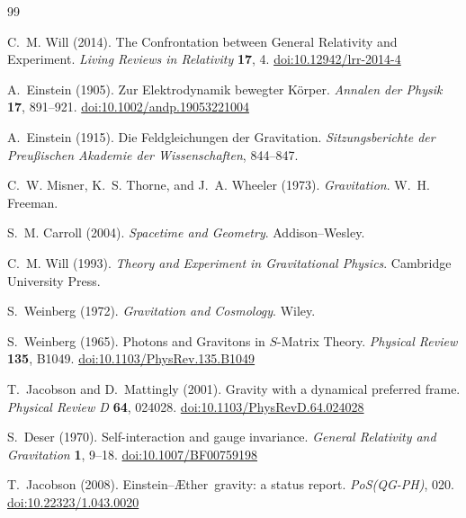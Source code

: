 \documentclass[12pt,a4paper]{article}
\providecommand{\doi}[1]{\href{https://doi.org/#1}{doi:#1}}
\newcommand{\Aether}{\AE ther}
\begin{document}


\begin{thebibliography}{99}

C.~M. Will (2014).
\newblock The Confrontation between General Relativity and Experiment.
\newblock \emph{Living Reviews in Relativity} \textbf{17}, 4.
\newblock \doi{10.12942/lrr-2014-4}

A.~Einstein (1905).
\newblock Zur Elektrodynamik bewegter K\"{o}rper.
\newblock \emph{Annalen der Physik} \textbf{17}, 891--921.
\newblock \doi{10.1002/andp.19053221004}

A.~Einstein (1915).
\newblock Die Feldgleichungen der Gravitation.
\newblock \emph{Sitzungsberichte der Preu\ss{}ischen Akademie der
  Wissenschaften}, 844--847.

C.~W. Misner, K.~S. Thorne, and J.~A. Wheeler (1973).
\newblock \emph{Gravitation}.
\newblock W.~H. Freeman.

S.~M. Carroll (2004).
\newblock \emph{Spacetime and Geometry}.
\newblock Addison--Wesley.

C.~M. Will (1993).
\newblock \emph{Theory and Experiment in Gravitational Physics}.
\newblock Cambridge University Press.

S.~Weinberg (1972).
\newblock \emph{Gravitation and Cosmology}.
\newblock Wiley.

S.~Weinberg (1965).
\newblock Photons and Gravitons in $S$-Matrix Theory.
\newblock \emph{Physical Review} \textbf{135}, B1049.
\newblock \doi{10.1103/PhysRev.135.B1049}

T.~Jacobson and D.~Mattingly (2001).
\newblock Gravity with a dynamical preferred frame.
\newblock \emph{Physical Review D} \textbf{64}, 024028.
\newblock \doi{10.1103/PhysRevD.64.024028}

S.~Deser (1970).
\newblock Self-interaction and gauge invariance.
\newblock \emph{General Relativity and Gravitation} \textbf{1}, 9--18.
\newblock \doi{10.1007/BF00759198}

T.~Jacobson (2008).
\newblock Einstein--\Aether\ gravity: a status report.
\newblock \emph{PoS(QG-PH)}, 020.
\newblock \doi{10.22323/1.043.0020}


\end{thebibliography}
\end{document}
